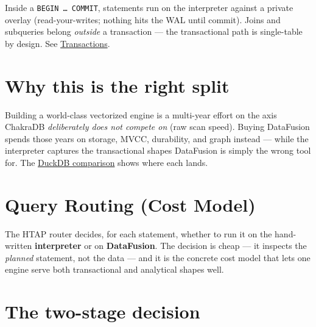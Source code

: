 \documentclass[
  11pt,
  openany]{book}
\begin{document}
Inside a \texttt{BEGIN\ …\ COMMIT}, statements run on the interpreter
against a private overlay (read-your-writes; nothing hits the WAL until
commit). Joins and subqueries belong \emph{outside} a transaction ---
the transactional path is single-table by design. See
\href{mvcc.md}{Transactions}.

\section{Why this is the right split}\label{why-this-is-the-right-split}

Building a world-class vectorized engine is a multi-year effort on the
axis ChakraDB \emph{deliberately does not compete on} (raw scan speed).
Buying DataFusion spends those years on storage, MVCC, durability, and
graph instead --- while the interpreter captures the transactional
shapes DataFusion is simply the wrong tool for. The
\href{../comparisons/comparisons.md}{DuckDB comparison} shows where each
lands.

\section{Query Routing (Cost Model)}\label{query-routing-cost-model}

The HTAP router decides, for each statement, whether to run it on the
hand-written \textbf{interpreter} or on \textbf{DataFusion}. The
decision is cheap --- it inspects the \emph{planned} statement, not the
data --- and it is the concrete cost model that lets one engine serve
both transactional and analytical shapes well.

\section{The two-stage decision}\label{the-two-stage-decision}
\end{document}
